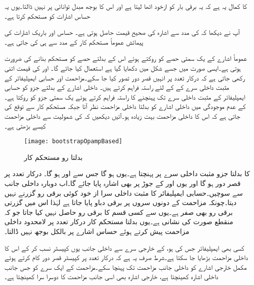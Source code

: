  کا کمال یہ ہے کہ یہ برقی بار  کو ازخود اٹھا لیتا ہے اور اس کا بوجھ مبدل توانائی پر نہیں ڈالتا۔یوں یہ حساس اشارات کو مستحکم کرتا ہے۔

آپ نے دیکھا کہ  کی مدد سے اشارہ کی صحیح قیمت حاصل ہوتی ہے۔ حساس اور باریک اشارات کی پیمائش عموماً مستحکم کار کے مدد سے ہی کی جاتی ہے۔

عموماً اشارے کے یک سمتی حصے کو روکتے ہوئے اس کے بدلتے حصے کو مستحکم بنانے کی ضرورت ہوتی ہے۔ایسی صورت میں  جسے شکل  میں دکھایا گیا ہے استعمال کیا جائے گا۔ اور  کی قیمت اتنی رکھی جاتی ہے کہ درکار تعدد پر انہیں قصر دور تصور کیا جا سکے۔مزاحمت  اور  حسابی ایمپلیفائر کے مثبت داخلی سرے  کے  کے لئے راستہ فراہم کرتے ہیں۔ داخلی اشارے کے بدلتے جزو کو حسابی ایمپلیفائر کے مثبت داخلی سرے  تک پہنچنے کا راستہ فراہم کرتے ہوئے یک سمتی جزو کو روکتا ہے۔ کے عدم موجودگی میں داخلی اشارے کو بدلتا داخلی مزاحمت  نظر آتا جبکہ مستحکم کار سے توقع کی جاتی ہے کہ اس کا داخلی مزاحمت بہت زیادہ ہو۔آئیں دیکھیں کہ  کی شمولیت سے داخلی مزاحمت کیسے بڑھتی ہے۔
\begin{figure}
\centering
\texttt{[image: bootstrapOpampBased]}
\caption{بدلتا رو مستحکم کار}
\label{شکل_بدلتا_رو_وسطی_دور}
\end{figure}
 کا بدلتا جزو  مثبت داخلی سرے پر پہنچتا ہے۔یوں  ہو گا جس سے  اور  ہو گا۔ درکار  تعدد پر قصر دور ہو گا اور یوں  اور  کے جوڑ پر بھی  اشارہ پایا جائے گا۔اب دوبارہ داخلی جانب سے سوچیں۔حسابی ایمپلیفائر کا مثبت داخلی سرا  از خود کوئی برقی رو گزرنے نہیں دیتا۔چونکہ مزاحمت  کے دونوں سروں پر  برقی دباو پایا جاتا ہے لہٰذا اس میں گزرتی برقی رو بھی صفر ہے۔یوں  سے کسی قسم کا برقی رو حاصل نہیں کیا جاتا جو کہ منقطع صورت کی نشانی ہے۔یوں بدلتا مستحکم کار درکار تعدد پر لامحدود داخلی مزاحمت پیش کرتے ہوئے حساس اشارے پر بالکل بوجھ نہیں ڈالتا۔

کسی بھی ایمپلیفائر جس کی   ہو،  کے  خارجی سرے  سے داخلی جانب یوں کپیسٹر  نسب کر کے اس کا داخلی مزاحمت بڑھایا جا سکتا ہے۔شرط صرف یہ ہے کہ درکار تعدد پر کپیسٹر قصر دور کام کرتے ہوئے مکمل خارجی اشارے کو داخلی جانب مزاحمت  تک  پہنچا سکے۔مزاحمت  کے ایک سرے کو جس جانب  داخلی اشارہ کھینچتا ہے، خارجی اشارہ بھی اسی جانب مزاحمت کا دوسرا سرا کھینچتا ہے۔

